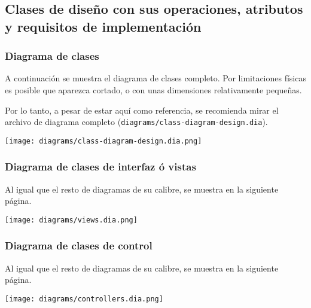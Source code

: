 \subsection{Clases de diseño con sus operaciones, atributos y requisitos de
implementación}

\subsubsection{Diagrama de clases}

A continuación se muestra el diagrama de clases completo. Por limitaciones
físicas es posible que aparezca cortado, o con unas dimensiones relativamente
pequeñas.

Por lo tanto, a pesar de estar aquí como referencia, se recomienda mirar el
archivo de diagrama completo (\texttt{diagrams/class-diagram-design.dia}).

\clearpage

\begin{sidewaysfigure}
    \texttt{[image: diagrams/class-diagram-design.dia.png]}
\end{sidewaysfigure}

\clearpage

\subsubsection{Diagrama de clases de interfaz ó vistas}

Al igual que el resto de diagramas de su calibre, se muestra en la siguiente
página.

\clearpage

\begin{sidewaysfigure}
    \texttt{[image: diagrams/views.dia.png]}
\end{sidewaysfigure}

\clearpage

\subsubsection{Diagrama de clases de control}

Al igual que el resto de diagramas de su calibre, se muestra en la siguiente
página.

\clearpage

\begin{sidewaysfigure}
    \texttt{[image: diagrams/controllers.dia.png]}
\end{sidewaysfigure}

\clearpage

